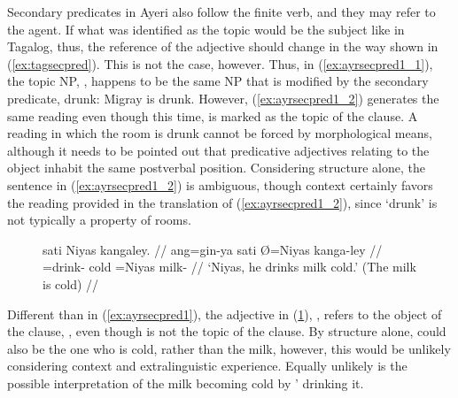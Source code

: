 Secondary predicates in Ayeri also follow the finite verb, and they may refer
to the agent. If what was identified as the topic would be the subject like in
Tagalog, thus, the reference of the adjective should change in the way shown in
(\ref{ex:tagsecpred}). This is not the case, however. Thus, in
(\ref{ex:ayrsecpred1_1}), the topic NP, , happens to be
the same NP that is modified by the secondary predicate, 
{drunk}: Migray is drunk. However, (\ref{ex:ayrsecpred1_2}) generates the same
reading even though this time,  is marked as the
topic of the clause. A reading in which the room is drunk cannot be forced by
morphological means, although it needs to be pointed out that predicative
adjectives relating to the object inhabit the same postverbal position.
Considering structure alone, the sentence in (\ref{ex:ayrsecpred1_2}) is
ambiguous, though context certainly favors the reading provided in the
translation of (\ref{ex:ayrsecpred1_2}), since `drunk' is not typically a
property of rooms.

\begin{figure}
\ex\label{ex:ayrsecpred2}
\begingl[aboveglcskip=1.5em, aboveglftskip=1.75em]
	 sati Niyas kangaley. //
	\glb ang=gin-ya sati Ø=Niyas kanga-ley //
	\glc \AgtT{}=drink-\TsgM{}
		cold
		\Top{}=Niyas%
		milk-\PargI{}%
			 //
	\glft `Niyas, he drinks milk cold.' (The milk is cold) //
\endgl
{}
\xe
\end{figure}

Different than in (\ref{ex:ayrsecpred1}), the adjective in
(\ref{ex:ayrsecpred2}), , refers to the object of the
clause, , even though  is not
the topic of the clause. By structure alone,  could also be
the one who is cold, rather than the milk, however, this would be unlikely
considering context and extralinguistic experience. Equally unlikely is the
possible interpretation of the milk becoming cold by '
drinking it.

